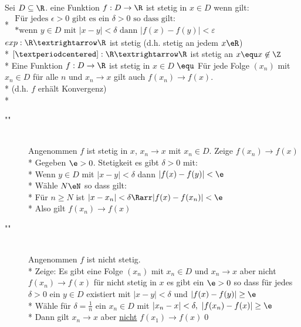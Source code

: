 \wdh
Sei $D \subseteq \R$. eine Funktion $f: D \to \R$ ist stetig in $x \in D$ wenn gilt:\\*
$\begin{array}{ll}
\text{Für jedes $\epsilon > 0$ gibt es ein $\delta > 0$ so dass gilt:}\\*
\text{wenn $y \in D$ mit $|x - y| < \delta$ dann $|f(x) - f(y)| < ε$}
\end{array}$
\bsp
$exp:\R→\R$ ist stetig (d.h. stetig an jedem $x\eR$)\\*
$[·]:\R→\R$ ist stetig an $x \equ x\not\in\Z$\\*
Eine Funktion $f: D \to \R$ ist stetig in $x \in D$ $\equ$ Für jede Folge $(x_n)$ mit $x_n \in D$ für alle $n$ und $x_n \to x$ gilt auch $f(x_n) \to f(x)$.\\*
(d.h. $f$ erhält Konvergenz)\\*
\bew
\begin{description}
\item["\Rarr"]{\hfill\\Angenommen $f$ ist stetig in $x$, $x_n→x$ mit $x_n\in D$. Zeige $f(x_n)→f(x)$\\*
Gegeben $\e>0$. Stetigkeit \Rarr{} es gibt $\delta>0$ mit:\\*
Wenn $y\in D$ mit $|x-y|<\delta$ dann $|f(x)-f(y)|<\e$\\*
Wähle $N\eN$ so dass gilt:\\*
Für $n\geq N$ ist $|x-x_n|<\delta \Rarr |f(x)-f(x_n)|<\e$\\*
Also gilt $f(x_n)→f(x)$}
\item["\Larr"]{\hfill\\Angenommen $f$ ist nicht stetig.\\*
Zeige: Es gibt eine Folge $(x_n)$ mit $x_n\in D$ und $x_n→x$ aber nicht $f(x_n)→f(x)$ für nicht stetig in $x$ \Rarr{} es gibt ein $\e>0$ so dass für jedes $\delta>0$ ein $y\in D$ existiert mit $|x-y|<\delta$ und $|f(x)-f(y)|\geq \e$\\*
Wähle für $\delta=\frac{1}{n}$ ein $x_n\in D$ mit $|x_n-x|<\delta,\ |f(x_n)-f(x)|\geq\e$\\*
Dann gilt $x_n→x$ aber \ul{nicht} $f(x_1)→f(x)$\qed}
\end{description}
